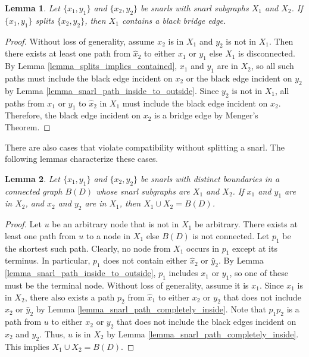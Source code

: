 \documentclass[11pt]{ucthesis}
\newtheorem{lemma}{Lemma}
\newtheorem*{proof}{Proof}
\begin{document}
\begin{lemma}
	Let $\{x_1, y_1\}$ and $\{x_2, y_2\}$ be snarls with snarl subgraphs $X_1$ and $X_2$. If $\{x_1, y_1\}$ splits $\{x_2, y_2\}$, then $X_1$ contains a black bridge edge.
	\label{lemma_splits_implies_bridge_edge}
\end{lemma}
\begin{proof}
	Without loss of generality, assume $x_2$ is in $X_1$ and $y_2$ is not in $X_1$. Then there exists at least one path from $\hat x_2$ to either $x_1$ or $y_1$ else $X_1$ is disconnected. By Lemma \ref{lemma_splits_implies_contained}, $x_1$ and $y_1$ are in $X_2$, so all such paths must include the black edge incident on $x_2$ or the black edge incident on $y_2$ by Lemma \ref{lemma_snarl_path_inside_to_outside}. Since $y_2$ is not in $X_1$, all paths from $x_1$ or $y_1$ to $\hat x_2$ in $X_1$ must include the black edge incident on $x_2$. Therefore, the black edge incident on $x_2$ is a bridge edge by Menger's Theorem.
\end{proof}

There are also cases that violate compatibility without splitting a snarl. The following lemmas characterize these cases.

\begin{lemma}
	Let $\{x_1,y_1\}$ and $\{x_2,y_2\}$ be snarls with distinct boundaries in a connected graph $B(D)$ whose snarl subgraphs are $X_1$ and $X_2$. If $x_1$ and $y_1$ are in $X_2$, and $x_2$ and $y_2$ are in $X_1$, then $X_1 \cup X_2 = B(D)$.
	\label{lemma_reciprocal_contain_implies_entire_graph}
\end{lemma}
\begin{proof}
	Let $u$ be an arbitrary node that is not in $X_1$ be arbitrary. There exists at least one path from $u$ to a node in $X_1$ else $B(D)$ is not connected. Let $p_1$ be the shortest such path. Clearly, no node from $X_1$ occurs in $p_1$ except at its terminus. In particular, $p_1$ does not contain either $\hat x_2$ or $\hat y_2$. By Lemma \ref{lemma_snarl_path_inside_to_outside}, $p_1$ includes $x_1$ or $y_1$, so one of these must be the terminal node. Without loss of generality, assume it is $x_1$. Since $x_1$ is in $X_2$, there also exists a path $p_2$ from $\hat x_1$ to either $x_2$ or $y_2$ that does not include $\hat x_2$ or $\hat y_2$ by Lemma \ref{lemma_snarl_path_completely_inside}. Note that $p_1p_2$ is a path from $u$ to either $x_2$ or $y_2$ that does not include the black edges incident on $x_2$ and $y_2$. Thus, $u$ is in $X_2$ by Lemma \ref{lemma_snarl_path_completely_inside}. This implies $X_1 \cup X_2 = B(D)$.
\end{proof}
\end{document}
